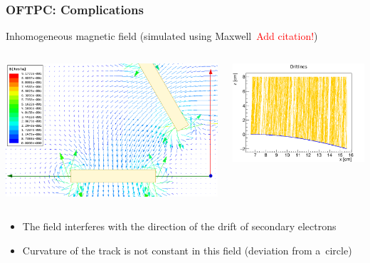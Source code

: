 \documentclass{beamer}
\begin{document}
	\begin{frame}
		\frametitle{OFTPC: Complications}
		Inhomogeneous magnetic field (simulated using Maxwell~\textcolor{red}{Add citation!})
		\begin{columns}
				\centering
				\begin{minipage}[t][4cm]{\textwidth}
					\centering
					\vspace{0.4cm}
					\includegraphics[width = 0.95 \textwidth]{../images/maxwell_zoom.png}
				\end{minipage}
				\centering
				\begin{minipage}[t][4cm]{\textwidth}
					\centering
					\includegraphics[width = 0.95 \textwidth]{../images/drift_xz.png}
				\end{minipage}
		\end{columns}
		\begin{itemize}
			\item The field interferes with the direction of the drift of secondary electrons
			\item Curvature of the track is not constant in this field (deviation from a~circle)
		\end{itemize}
	\end{frame}
	
\end{document}
